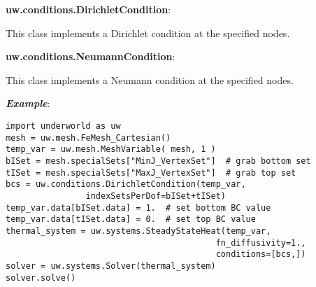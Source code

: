 \documentclass[10pt,landscape]{article}
\begin{document}
\begin{multicols}{2}
\noindent\textbf{uw.conditions.DirichletCondition}:
\begin{addmargin}[1em]{2em}
This class implements a Dirichlet condition at the specified nodes.
\end{addmargin}
\vspace{1mm}

\noindent\textbf{uw.conditions.NeumannCondition}:
\begin{addmargin}[1em]{2em}
This class implements a Neumann condition at the specified nodes.
\end{addmargin}

\vspace{2mm}
\noindent\textbf{\textit{Example}}:
\begin{lstlisting}
import underworld as uw
mesh = uw.mesh.FeMesh_Cartesian()
temp_var = uw.mesh.MeshVariable( mesh, 1 )
bISet = mesh.specialSets["MinJ_VertexSet"]  # grab bottom set
tISet = mesh.specialSets["MaxJ_VertexSet"]  # grab top set
bcs = uw.conditions.DirichletCondition(temp_var,
                indexSetsPerDof=bISet+tISet)
temp_var.data[bISet.data] = 1.  # set bottom BC value
temp_var.data[tISet.data] = 0.  # set top BC value
thermal_system = uw.systems.SteadyStateHeat(temp_var,
                                          fn_diffusivity=1.,
                                          conditions=[bcs,])
solver = uw.systems.Solver(thermal_system)
solver.solve()
\end{lstlisting}


\end{multicols}
\end{document}
